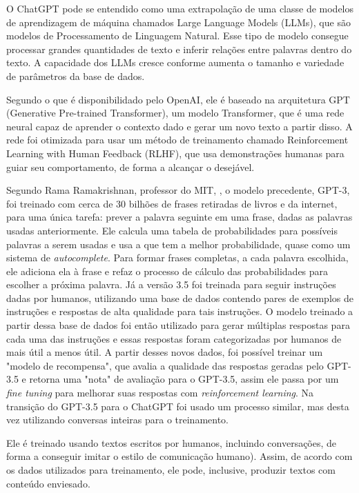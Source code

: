 O ChatGPT pode se entendido como uma extrapolação de uma classe de modelos de aprendizagem de máquina chamados Large Language Models (LLMs), que são modelos de Processamento de Linguagem Natural. Esse tipo de modelo consegue processar grandes quantidades de texto e inferir relações entre palavras dentro do texto. A capacidade dos LLMs cresce conforme aumenta o tamanho e variedade de parâmetros da base de dados.\cite{towardsdatascience}

Segundo o que é disponibilidado pelo OpenAI\cite{OpenAI}, ele é baseado na arquitetura GPT (Generative Pre-trained Transformer), um modelo Transformer, que é uma rede neural capaz de aprender o contexto dado e gerar um novo texto a partir disso. A rede foi otimizada para usar um método de treinamento chamado Reinforcement Learning with Human Feedback (RLHF), que usa demonstrações humanas para guiar seu comportamento, de forma a alcançar o desejável.

Segundo Rama Ramakrishnan, professor do MIT, \cite{MIT}, o modelo precedente, GPT-3, foi treinado com cerca de 30 bilhões de frases retiradas de livros e da internet, para uma única tarefa: prever a palavra seguinte em uma frase, dadas as palavras usadas anteriormente. Ele calcula uma tabela de probabilidades para possíveis palavras a serem usadas e usa a que tem a melhor probabilidade, quase como um sistema de \textit{autocomplete}. Para formar frases completas, a cada palavra escolhida, ele adiciona ela à frase e refaz o processo de cálculo das probabilidades para escolher a próxima palavra. Já a versão 3.5 foi treinada para seguir instruções dadas por humanos, utilizando uma base de dados contendo pares de exemplos de instruções e respostas de alta qualidade para tais instruções. O modelo treinado a partir dessa base de dados foi então utilizado para gerar múltiplas respostas para cada uma das instruções e essas respostas foram categorizadas por humanos de mais útil a menos útil. A partir desses novos dados, foi possível treinar um "modelo de recompensa", que avalia a qualidade das respostas geradas pelo GPT-3.5 e retorna uma "nota" de avaliação para o GPT-3.5, assim ele passa por um \textit{fine tuning} para melhorar suas respostas com \textit{reinforcement learning}. Na transição do GPT-3.5 para o ChatGPT foi usado um processo similar, mas desta vez utilizando conversas inteiras para o treinamento.

Ele é treinado usando textos escritos por humanos, incluindo conversações, de forma a conseguir imitar o estilo de comunicação humano). Assim, de acordo com os dados utilizados para treinamento, ele pode, inclusive, produzir textos com conteúdo enviesado.

